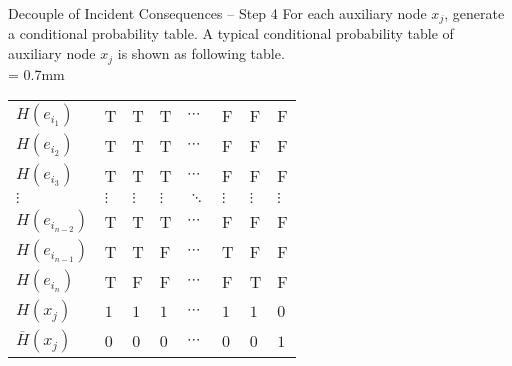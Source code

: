 \begin{frame}{Decouple of Incident Consequences -- Step 4}
    \label{Dynamic Risk Assessment: Decouple of Incident Consequences Step 4}
    For each auxiliary node $x_j$, generate a conditional probability table. A typical conditional probability table of auxiliary node $x_j$ is shown as following table.\\[-15pt]
    \extrarowsep = 0.7mm
    \begin{center}
      \begin{tabu}to 
        $H(e_{i_1})$        & T & T & T & $\cdots$ & F & F & F\\
        $H(e_{i_2})$        & T & T & T & $\cdots$ & F & F & F\\
        $H(e_{i_3})$        & T & T & T & $\cdots$ & F & F & F\\
        $\vdots$            & $\vdots$ & $\vdots$ & $\vdots$ & $\ddots$ & $\vdots$ & $\vdots$ & $\vdots$\\
        $H(e_{i_{n-2}})$    & T & T & T & $\cdots$ & F & F & F\\
        $H(e_{i_{n-1}})$    & T & T & F & $\cdots$ & T & F & F\\
        $H(e_{i_n})$        & T & F & F & $\cdots$ & F & T & F\\
        \hline
        $H(x_j)$            & $1$ & $1$ & $1$ & $\cdots$ & $1$ & $1$ & $0$ \\
        $\overline{H}(x_j)$ & $0$ & $0$ & $0$ & $\cdots$ & $0$ & $0$ & $1$
      \end{tabu}
    \end{center}
\end{frame}

